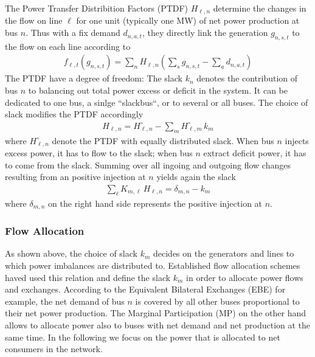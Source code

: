\documentclass[11pt]{article}
\newcommand{\generation}[1][n]{g_{#1,s,t}}
\newcommand{\demand}[1][n]{d_{#1,a,t}}
\newcommand{\incidence}[1][n]{K_{#1,\ell}}
\newcommand{\ptdf}[1][n]{H_{\ell,#1}}
\newcommand{\ptdfEqual}[1][n]{\ptdf[#1]^\circ}
\newcommand{\slack}[1][n]{k_{#1}}
\newcommand{\flow}{f_{\ell,t}}
\begin{document}
The Power Transfer Distribition Factors (PTDF) $\ptdf$ determine the changes in the flow on line $\ell$ for one unit (typically one MW) of net power production at bus $n$. Thus with a fix demand $\demand$, they directly link the generation $\generation$ to the flow on each line according to
\begin{align}
 \flow\left( \generation\right)  = \sum_n \ptdf \left( \sum_s \generation- \sum_a \demand \right)  
 \label{eq:flow_from_ptdf}
\end{align}
The PTDF have a degree of freedom: The slack $\slack$ denotes the contribution of bus $n$ to balancing out total power excess or deficit in the system. It can be dedicated to one bus, a sinlge ``slackbus``, or to several or all buses. The choice of slack modifies the PTDF accordingly 
\begin{align}
 \ptdf = \ptdfEqual - \sum_m \ptdfEqual[m]  \, \slack[m]
 \label{eq:ptdf_slacked}
\end{align}
where $\ptdfEqual$ denote the PTDF with equally distributed slack.
When bus $n$ injects excess power, it has to flow to the slack; when bus $n$ extract deficit power, it has to come from the slack. Summing over all ingoing and outgoing flow changes resulting from an positive injection at $n$ yields again the slack 
\begin{align}
\sum_\ell \incidence[m] \, \ptdf =  \delta_{m,n} - \slack[m] 
\label{eq:slack}
\end{align}
where $\delta_{m,n}$ on the right hand side represents the positive injection at $n$.

\subsubsection*{Flow Allocation} \label{sec:flow_allocation}

As shown above, the choice of slack $\slack[m]$ decides on the generators and lines to which power imbalances are distributed to. Established flow allocation schemes haved used this relation and define the slack $\slack[m]$ in order to allocate power flows and exchanges. According to the Equivalent Bilateral Exchanges (EBE) for example, the net demand of bus $n$ is covered by all other buses proportional to their net power production. The Marginal Participation (MP) on the other hand allows to allocate power also to buses with net demand and net production at the same time. In the following we focus on the power that is allocated to net consumers in the network. \\  
\end{document}
